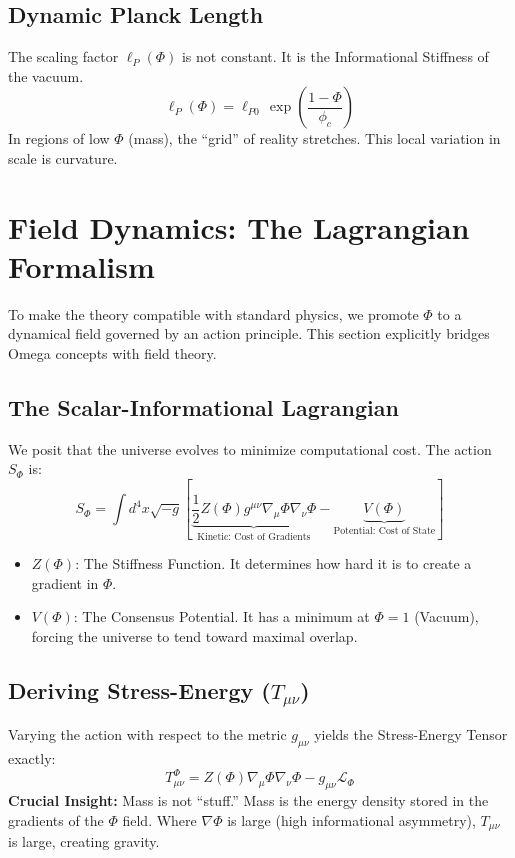 \documentclass{article}
\begin{document}
\subsection{Dynamic Planck Length}
The scaling factor $\ell_P(\Phi)$ is not constant. It is the Informational Stiffness of the vacuum.
\begin{equation}
    \ell_P(\Phi) = \ell_{P0} \, \exp\left( \frac{1 - \Phi}{\phi_c} \right)
\end{equation}
In regions of low $\Phi$ (mass), the ``grid'' of reality stretches. This local variation in scale is curvature.

\section{Field Dynamics: The Lagrangian Formalism}
To make the theory compatible with standard physics, we promote $\Phi$ to a dynamical field governed by an action principle. This section explicitly bridges Omega concepts with field theory.

\subsection{The Scalar-Informational Lagrangian}
We posit that the universe evolves to minimize computational cost. The action $S_\Phi$ is:
\begin{equation}
    S_\Phi = \int d^4x \sqrt{-g} \left[ \underbrace{\frac{1}{2} Z(\Phi) g^{\mu\nu} \nabla_\mu \Phi \nabla_\nu \Phi}_{\text{Kinetic: Cost of Gradients}} - \underbrace{V(\Phi)}_{\text{Potential: Cost of State}} \right]
\end{equation}
\begin{itemize}
    \item $Z(\Phi)$: The Stiffness Function. It determines how hard it is to create a gradient in $\Phi$.
    \item $V(\Phi)$: The Consensus Potential. It has a minimum at $\Phi=1$ (Vacuum), forcing the universe to tend toward maximal overlap.
\end{itemize}

\subsection{Deriving Stress-Energy ($T_{\mu\nu}$)}
Varying the action with respect to the metric $g_{\mu\nu}$ yields the Stress-Energy Tensor exactly:
\begin{equation}
    \boxed{T_{\mu\nu}^\Phi = Z(\Phi)\nabla_\mu\Phi \nabla_\nu\Phi - g_{\mu\nu}\mathcal{L}_\Phi}
\end{equation}
\textbf{Crucial Insight:} Mass is not ``stuff.'' Mass is the energy density stored in the gradients of the $\Phi$ field. Where $\nabla \Phi$ is large (high informational asymmetry), $T_{\mu\nu}$ is large, creating gravity.
\end{document}
